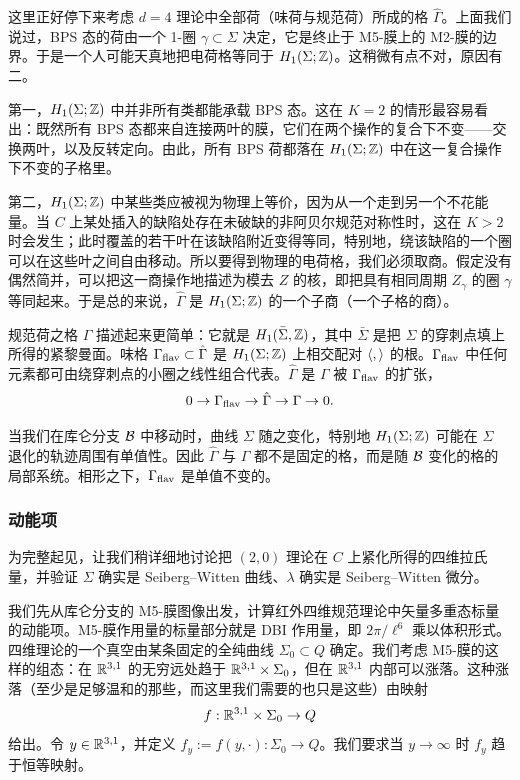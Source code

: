 这里正好停下来考虑 $d=4$ 理论中全部荷（味荷与规范荷）所成的格 $\hat\Gamma$。上面我们说过，BPS 态的荷由一个 1-圈 $\gamma \subset \Sigma$ 决定，它是终止于 M5-膜上的 M2-膜的边界。于是一个人可能天真地把电荷格等同于 $H_1(\Sigma; \mathbb{Z})$。这稍微有点不对，原因有二。

第一，$H_1(\Sigma; \mathbb{Z})$ 中并非所有类都能承载 BPS 态。这在 $K=2$ 的情形最容易看出：既然所有 BPS 态都来自连接两叶的膜，它们在两个操作的复合下不变——交换两叶，以及反转定向。由此，所有 BPS 荷都落在 $H_1(\Sigma; \mathbb{Z})$ 中在这一复合操作下不变的子格里。

第二，$H_1(\Sigma; \mathbb{Z})$ 中某些类应被视为物理上等价，因为从一个走到另一个不花能量。当 $C$ 上某处插入的缺陷处存在未破缺的非阿贝尔规范对称性时，这在 $K>2$ 时会发生；此时覆盖的若干叶在该缺陷附近变得等同，特别地，绕该缺陷的一个圈可以在这些叶之间自由移动。所以要得到物理的电荷格，我们必须取商。假定没有偶然简并，可以把这一商操作地描述为模去 $Z$ 的核，即把具有相同周期 $Z_\gamma$ 的圈 $\gamma$ 等同起来。于是总的来说，$\hat\Gamma$ 是 $H_1(\Sigma; \mathbb{Z})$ 的一个子商（一个子格的商）。

规范荷之格 $\Gamma$ 描述起来更简单：它就是 $H_1(\bar\Sigma, \mathbb{Z})$，其中 $\bar\Sigma$ 是把 $\Sigma$ 的穿刺点填上所得的紧黎曼面。味格 $\Gamma_{\rm flav} \subset \hat\Gamma$ 是 $H_1(\Sigma;\mathbb{Z})$ 上相交配对 $\langle , \rangle$ 的根。$\Gamma_{\rm flav}$ 中任何元素都可由绕穿刺点的小圈之线性组合代表。$\hat\Gamma$ 是 $\Gamma$ 被 $\Gamma_{\rm flav}$ 的扩张，
\begin{equation}\label{eq:Lattice-ExactSeq}
0 \to \Gamma_{\rm flav} \to \hat\Gamma \to \Gamma \to 0.
\end{equation}

当我们在库仑分支 $\mathcal{B}$ 中移动时，曲线 $\Sigma$ 随之变化，特别地 $H_1(\Sigma; \mathbb{Z})$ 可能在 $\Sigma$ 退化的轨迹周围有单值性。因此 $\hat\Gamma$ 与 $\Gamma$ 都不是固定的格，而是随 $\mathcal{B}$ 变化的格的局部系统。相形之下，$\Gamma_{\rm flav}$ 是单值不变的。

\subsubsection{动能项}\label{subsubsec:KineticTerms}

为完整起见，让我们稍详细地讨论把 $(2,0)$ 理论在 $C$ 上紧化所得的四维拉氏量，并验证 $\Sigma$ 确实是 Seiberg–Witten 曲线、$\lambda$ 确实是 Seiberg–Witten 微分。

我们先从库仑分支的 M5-膜图像出发，计算红外四维规范理论中矢量多重态标量的动能项。M5-膜作用量的标量部分就是 DBI 作用量，即 $2 \pi / \ell^6$ 乘以体积形式。四维理论的一个真空由某条固定的全纯曲线 $\Sigma_0 \subset Q$ 确定。我们考虑 M5-膜的这样的组态：在 $\mathbb{R}^{3,1}$ 的无穷远处趋于 $\mathbb{R}^{3,1} \times \Sigma_0$，但在 $\mathbb{R}^{3,1}$ 内部可以涨落。这种涨落（至少是足够温和的那些，而这里我们需要的也只是这些）由映射
\begin{equation}
f: \mathbb{R}^{3,1} \times \Sigma_0 \to Q
\end{equation}
给出。令 $y\in \mathbb{R}^{3,1}$，并定义 $f_y:=f(y,\cdot): \Sigma_0 \to Q$。我们要求当 $y\to \infty$ 时 $f_y$ 趋于恒等映射。

